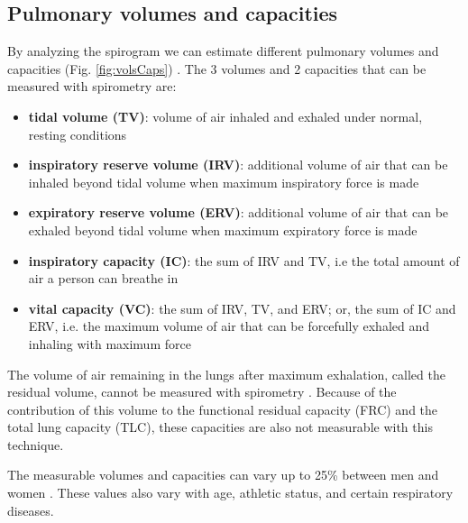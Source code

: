 \documentclass[12pt]{article}
\begin{document}
\subsection*{Pulmonary volumes and capacities}

By analyzing the spirogram we can estimate different pulmonary volumes and capacities (Fig. \ref{fig:volsCaps}) \cite{guyton20006textbook,openStax2016resp}. The 3 volumes and 2 capacities that can be measured with spirometry are:

\begin{itemize}
\item \textbf{tidal volume (TV)}: volume of air inhaled and exhaled under normal, resting conditions
\item \textbf{inspiratory reserve volume (IRV)}: additional volume of air that can be inhaled beyond tidal volume when maximum inspiratory force is made
\item \textbf{expiratory reserve volume (ERV)}: additional volume of air that can be exhaled beyond tidal volume when maximum expiratory force is made
\item \textbf{inspiratory capacity (IC)}: the sum of IRV and TV, i.e the total amount of air a person can breathe in
\item \textbf{vital capacity (VC)}: the sum of IRV, TV, and ERV; or, the sum of IC and ERV, i.e. the maximum volume of air that can be forcefully exhaled and inhaling with maximum force
\end{itemize}

The volume of air remaining in the lungs after maximum exhalation, called the residual volume, cannot be measured with spirometry \cite{guyton20006textbook}. Because of the contribution of this volume to the functional residual capacity (FRC) and the total lung capacity (TLC), these capacities are also not measurable with this technique. 

The measurable volumes and capacities can vary up to 25\% between men and women \cite{guyton20006textbook}. These values also vary with age, athletic status, and certain respiratory diseases.
\end{document}

